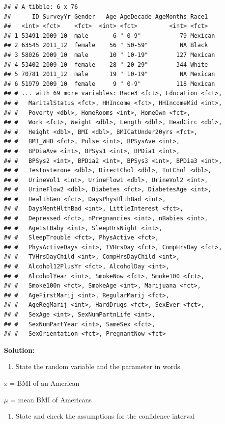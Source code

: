 \documentclass[
]{book}
\providecommand{\tightlist}{%
  \setlength{\itemsep}{0pt}\setlength{\parskip}{0pt}}
\begin{document}
\begin{verbatim}
## # A tibble: 6 x 76
##      ID SurveyYr Gender   Age AgeDecade AgeMonths Race1  
##   <int> <fct>    <fct>  <int> <fct>         <int> <fct>  
## 1 53491 2009_10  male       6 " 0-9"           79 Mexican
## 2 63545 2011_12  female    56 " 50-59"         NA Black  
## 3 58026 2009_10  male      10 " 10-19"        127 Mexican
## 4 53402 2009_10  female    28 " 20-29"        344 White  
## 5 70781 2011_12  male      19 " 10-19"         NA Mexican
## 6 51979 2009_10  female     9 " 0-9"          118 Mexican
## # ... with 69 more variables: Race3 <fct>, Education <fct>,
## #   MaritalStatus <fct>, HHIncome <fct>, HHIncomeMid <int>,
## #   Poverty <dbl>, HomeRooms <int>, HomeOwn <fct>,
## #   Work <fct>, Weight <dbl>, Length <dbl>, HeadCirc <dbl>,
## #   Height <dbl>, BMI <dbl>, BMICatUnder20yrs <fct>,
## #   BMI_WHO <fct>, Pulse <int>, BPSysAve <int>,
## #   BPDiaAve <int>, BPSys1 <int>, BPDia1 <int>,
## #   BPSys2 <int>, BPDia2 <int>, BPSys3 <int>, BPDia3 <int>,
## #   Testosterone <dbl>, DirectChol <dbl>, TotChol <dbl>,
## #   UrineVol1 <int>, UrineFlow1 <dbl>, UrineVol2 <int>,
## #   UrineFlow2 <dbl>, Diabetes <fct>, DiabetesAge <int>,
## #   HealthGen <fct>, DaysPhysHlthBad <int>,
## #   DaysMentHlthBad <int>, LittleInterest <fct>,
## #   Depressed <fct>, nPregnancies <int>, nBabies <int>,
## #   Age1stBaby <int>, SleepHrsNight <int>,
## #   SleepTrouble <fct>, PhysActive <fct>,
## #   PhysActiveDays <int>, TVHrsDay <fct>, CompHrsDay <fct>,
## #   TVHrsDayChild <int>, CompHrsDayChild <int>,
## #   Alcohol12PlusYr <fct>, AlcoholDay <int>,
## #   AlcoholYear <int>, SmokeNow <fct>, Smoke100 <fct>,
## #   Smoke100n <fct>, SmokeAge <int>, Marijuana <fct>,
## #   AgeFirstMarij <int>, RegularMarij <fct>,
## #   AgeRegMarij <int>, HardDrugs <fct>, SexEver <fct>,
## #   SexAge <int>, SexNumPartnLife <int>,
## #   SexNumPartYear <int>, SameSex <fct>,
## #   SexOrientation <fct>, PregnantNow <fct>
\end{verbatim}

\textbf{Solution:}

\begin{enumerate}
\def\labelenumi{\arabic{enumi}.}
\tightlist
\item
  State the random variable and the parameter in words.
\end{enumerate}

\emph{x} = BMI of an American

\(\mu\) = mean BMI of Americans

\begin{enumerate}
\def\labelenumi{\arabic{enumi}.}
\setcounter{enumi}{1}
\tightlist
\item
  State and check the assumptions for the confidence interval
\end{enumerate}
\end{document}
